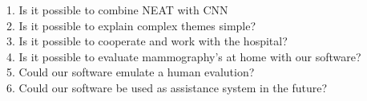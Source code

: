 1.	Is it possible to combine NEAT with CNN\\
2.	Is it possible to explain complex themes simple?\\
3.	Is it possible to cooperate and work with the hospital?\\
4.	Is it possible to evaluate mammography’s at home with our software?\\
5.	Could our software emulate a human evalution?\\
6.	Could our software be used as assistance system in the future?\\
